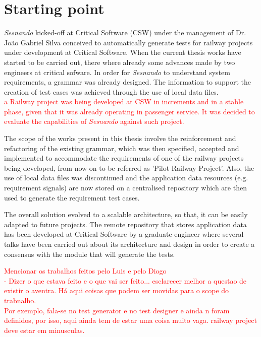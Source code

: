 \newpage
\section{Starting point}
\label{sec:starting_point}


\textit{Sesnando} kicked-off at Critical Software (CSW) under the management of Dr. João Gabriel Silva conceived to automatically generate tests for railway projects under development at Critical Software. When the current thesis works have started to be carried out, there where already some advances made by two engineers at critical sofware. In order for \textit{Sesnando} to understand system requirements, a grammar was already designed. The information to support the creation of test cases was achieved through the use of local data files.\\

\textcolor{red}{a Railway project was being developed at CSW in increments and in a stable phase, given that it was already operating in passenger service. It was decided to evaluate the capabilities of \textit{Sesnando} against such project.\\} 

The scope of the works present in this thesis involve the reinforcement and refactoring of the existing grammar, which was then specified, accepted and implemented to accommodate the requirements of one of the railway projects being developed, from now on to be referred as 'Pilot Railway Project'. Also, the use of  local data files was discontinued and the application data resources (e.g. requirement signals) are now stored on a centralised repository which are then used to generate the requirement test cases.

The overall solution evolved to a scalable architecture, so that, it can be easily adapted to future projects.
The remote repository that stores application data has been developed at Critical Software by a graduate engineer where several talks have been carried out about its architecture and design in order to create a consensus with the module that will generate the tests.

\textcolor{red}{Mencionar os trabalhos feitos pelo Luis e pelo Diogo\\
- Dizer o que estava feito e o que vai ser feito... esclarecer melhor a questao de existir o aventra. Há aqui coisas que podem ser movidas para o scope do trabnalho. \\Por exemplo, fala-se no test generator e no test designer e ainda n foram definidos, por isso, aqui ainda tem de estar uma coisa muito vaga. railway project deve estar em minusculas.}


